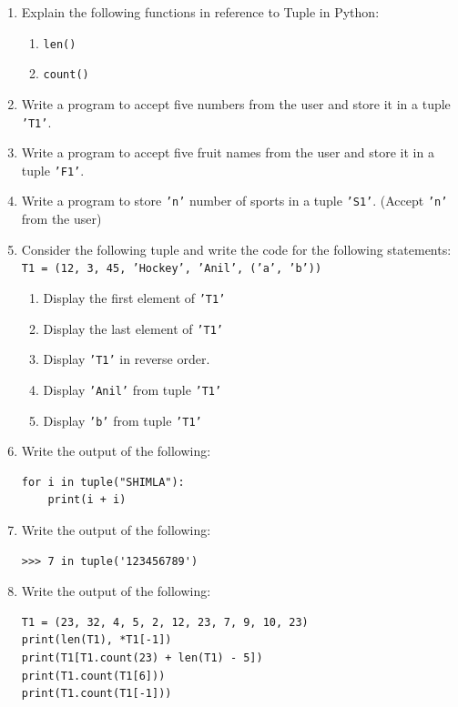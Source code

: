 \documentclass[11pt,a4paper]{article}
\begin{document}
\begin{enumerate}[label=\textbf{Q\arabic*.}]
\item Explain the following functions in reference to Tuple in Python:
\begin{enumerate}
    \item \texttt{len()}
    \item \texttt{count()}
\end{enumerate}

\item Write a program to accept five numbers from the user and store it in a tuple \texttt{'T1'}.

\item Write a program to accept five fruit names from the user and store it in a tuple \texttt{'F1'}.

\item Write a program to store \texttt{'n'} number of sports in a tuple \texttt{'S1'}. (Accept \texttt{'n'} from the user)

\item Consider the following tuple and write the code for the following statements:\\
\texttt{T1 = (12, 3, 45, 'Hockey', 'Anil', ('a', 'b'))}
\begin{enumerate}
    \item Display the first element of \texttt{'T1'}
    \item Display the last element of \texttt{'T1'}
    \item Display \texttt{'T1'} in reverse order.
    \item Display \texttt{'Anil'} from tuple \texttt{'T1'}
    \item Display \texttt{'b'} from tuple \texttt{'T1'}
\end{enumerate}

\item Write the output of the following:
\begin{lstlisting}
for i in tuple("SHIMLA"):
    print(i + i)
\end{lstlisting}

\item Write the output of the following:
\begin{lstlisting}
>>> 7 in tuple('123456789')
\end{lstlisting}

\item Write the output of the following:
\begin{lstlisting}
T1 = (23, 32, 4, 5, 2, 12, 23, 7, 9, 10, 23)
print(len(T1), *T1[-1])
print(T1[T1.count(23) + len(T1) - 5])
print(T1.count(T1[6]))
print(T1.count(T1[-1]))
\end{lstlisting}


\end{enumerate}
\end{document}
